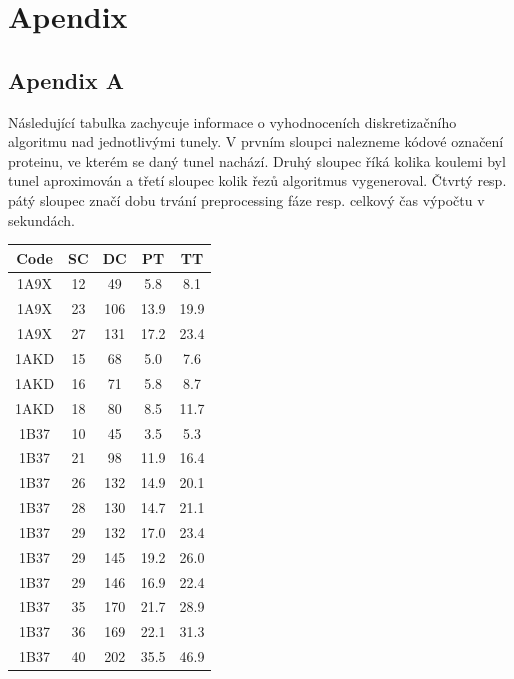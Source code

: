 \chapter*{Apendix}

\section*{Apendix A}
Následující tabulka zachycuje informace o vyhodnoceních diskretizačního
algoritmu nad jednotlivými tunely. V prvním sloupci nalezneme kódové označení
proteinu, ve kterém se daný tunel nachází. Druhý sloupec říká kolika koulemi byl
tunel aproximován a třetí sloupec kolik řezů algoritmus vygeneroval. Čtvrtý
resp. pátý sloupec značí dobu trvání preprocessing fáze resp. celkový čas výpočtu
v sekundách.
\begin{table}[htbp]
    \centering
    \fontsize{9}{11}\selectfont
    \begin{tabular}{||c | c c c c||}
        \hline
        Code & SC & DC & PT & TT \\ [0.5ex]
        \hline\hline
        1A9X & 12 & 49 & 5.8 & 8.1 \\
        \hline
        1A9X & 23 & 106 & 13.9 & 19.9 \\
        \hline
        1A9X & 27 & 131 & 17.2 & 23.4 \\
        \hline
        1AKD & 15 & 68 & 5.0 & 7.6 \\
        \hline
        1AKD & 16 & 71 & 5.8 & 8.7 \\
        \hline
        1AKD & 18 & 80 & 8.5 & 11.7 \\
        \hline
        1B37 & 10 & 45 & 3.5 & 5.3 \\
        \hline
        1B37 & 21 & 98 & 11.9 & 16.4 \\
        \hline
        1B37 & 26 & 132 & 14.9 & 20.1 \\
        \hline
        1B37 & 28 & 130 & 14.7 & 21.1 \\
        \hline
        1B37 & 29 & 132 & 17.0 & 23.4 \\
        \hline
        1B37 & 29 & 145 & 19.2 & 26.0 \\
        \hline
        1B37 & 29 & 146 & 16.9 & 22.4 \\
        \hline
        1B37 & 35 & 170 & 21.7 & 28.9 \\
        \hline
        1B37 & 36 & 169 & 22.1 & 31.3 \\
        \hline
        1B37 & 40 & 202 & 35.5 & 46.9 \\

\end{tabular}
\end{table}
